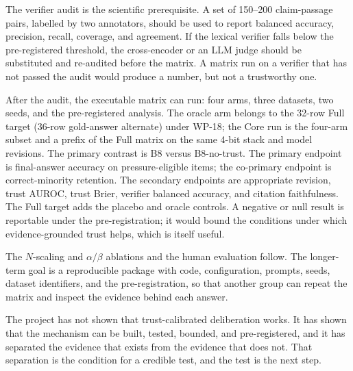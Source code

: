 The verifier audit is the scientific prerequisite. A set of 150--200 claim-passage pairs, labelled by two annotators, should be used to report balanced accuracy, precision, recall, coverage, and agreement. If the lexical verifier falls below the pre-registered threshold, the cross-encoder or an LLM judge should be substituted and re-audited before the matrix. A matrix run on a verifier that has not passed the audit would produce a number, but not a trustworthy one.

After the audit, the executable matrix can run: four arms, three datasets, two seeds, and the pre-registered analysis. The oracle arm belongs to the 32-row Full target (36-row gold-answer alternate) under WP-18; the Core run is the four-arm subset and a prefix of the Full matrix on the same 4-bit stack and model revisions. The primary contrast is B8 versus B8-no-trust. The primary endpoint is final-answer accuracy on pressure-eligible items; the co-primary endpoint is correct-minority retention. The secondary endpoints are appropriate revision, trust AUROC, trust Brier, verifier balanced accuracy, and citation faithfulness. The Full target adds the placebo and oracle controls. A negative or null result is reportable under the pre-registration; it would bound the conditions under which evidence-grounded trust helps, which is itself useful.

The $N$-scaling and $\alpha/\beta$ ablations and the human evaluation follow. The longer-term goal is a reproducible package with code, configuration, prompts, seeds, dataset identifiers, and the pre-registration, so that another group can repeat the matrix and inspect the evidence behind each answer.

The project has not shown that trust-calibrated deliberation works. It has shown that the mechanism can be built, tested, bounded, and pre-registered, and it has separated the evidence that exists from the evidence that does not. That separation is the condition for a credible test, and the test is the next step.
